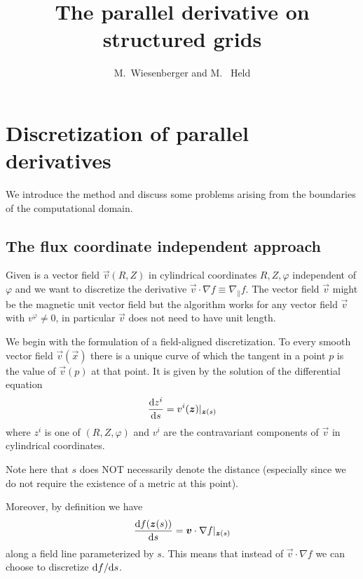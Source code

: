 






\title{The parallel derivative on structured grids}
\author{M.~Wiesenberger and M.~ Held}

\maketitle

\tableofcontents
\section{Discretization of parallel derivatives} \label{sec:parallel}
We introduce the method
and discuss some problems arising from the boundaries of the computational domain.

\subsection{The flux coordinate independent approach} \label{sec:parallela}
Given is a vector field $\vec v(R,Z)$ in cylindrical coordinates $R,Z,\varphi$ independent of $\varphi$ and we want to
discretize the derivative $\vec v \cdot\nabla f \equiv \nabla_\parallel f$.
The vector field $\vec v$ might be the magnetic unit vector field but the algorithm works
for any vector field $\vec v$ with $v^\varphi\neq 0$, in particular $\vec v$ does not need
to have unit length.

We begin with the formulation of a field-aligned discretization.
To every smooth vector field $\vec v(\vec x)$ there is a unique curve of which the
tangent in a point $p$ is the value of $\vec v(p)$ at that point. It is given by
the solution of the differential equation
\begin{align}
  \frac{\mathrm{d} z^i}{\mathrm{d} s} = v^i({\boldsymbol{z}})|_{{\boldsymbol{z}}(s)}
    \label{eq:integralcurve}
\end{align}
where $z^i$ is one of $(R, Z, \varphi)$ and $v^i$ are the contravariant components
of $\vec v$ in cylindrical coordinates.
\begin{tcolorbox}[title=Note]
Note here that $s$ does NOT necessarily denote the distance
(especially since we do not require the existence of a metric at this point).
\end{tcolorbox}
Moreover, by definition we have
\begin{align}
    \frac{\mathrm{d} f({\boldsymbol{z}}(s))}{\mathrm{d} s} = {\boldsymbol{v}}\cdot \nabla f|_{{\boldsymbol{z}}(s)}
    \label{eq:fieldline_original}
\end{align}
along a field line parameterized by $s$.
This means that instead of $\vec v \cdot \nabla f$ we can choose to discretize ${\mathrm{d} f}/{\mathrm{d} s}$.

